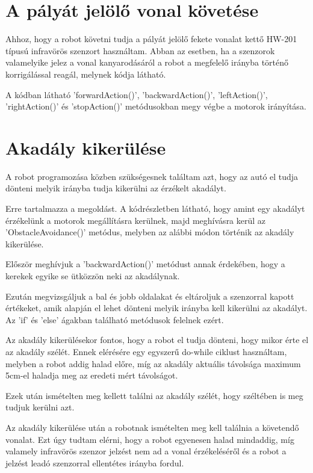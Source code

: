 \documentclass[]{thesis-ekf}
\theoremstyle{definition}
\begin{document}
\section{A pályát jelölő vonal követése}


Ahhoz, hogy a robot követni tudja a pályát jelölő fekete vonalat kettő HW-201 típusú infravörös szenzort használtam. Abban az esetben, ha a szenzorok valamelyike jelez a vonal kanyarodásáról a robot a megfelelő irányba történő korrigálással reagál, melynek kódja  látható.

A kódban látható 'forwardAction()', 'backwardAction()', 'leftAction()', 'rightAction()' és 'stopAction()' metódusokban megy végbe a motorok irányítása.
\section{Akadály kikerülése}
A robot programozása közben szükségesnek találtam azt, hogy az autó el tudja dönteni melyik irányba tudja kikerülni az érzékelt akadályt.

Erre  tartalmazza a megoldást. A kódrészletben látható, hogy amint egy akadályt érzékelünk a motorok megállításra kerülnek, majd meghívásra kerül az 'ObstacleAvoidance()' metódus, melyben az alábbi módon történik az akadály kikerülése.

Először meghívjuk a 'backwardAction()' metódust annak érdekében, hogy a kerekek egyike se ütközzön neki az akadálynak.

Ezután megvizsgáljuk a bal és jobb oldalakat és eltároljuk a szenzorral kapott értékeket, amik alapján el lehet dönteni melyik irányba kell kikerülni az akadályt. Az 'if' és 'else' ágakban található metódusok felelnek ezért.

Az akadály kikerülésekor fontos, hogy a robot el tudja dönteni, hogy mikor érte el az akadály szélét. Ennek elérésére egy egyszerű do-while ciklust használtam, melyben a robot addig halad előre, míg az akadály aktuális távolsága maximum 5cm-el haladja meg az eredeti mért távolságot.

Ezek után ismételten meg kellett találni az akadály szélét, hogy széltében is meg tudjuk kerülni azt.

Az akadály kikerülése után a robotnak ismételten meg kell találnia a követendő vonalat. Ezt úgy tudtam elérni, hogy a robot egyenesen halad mindaddig, míg valamely infravörös szenzor jelzést nem ad a vonal érzékeléséről és a robot a jelzést leadó szenzorral ellentétes irányba fordul.
\end{document}
